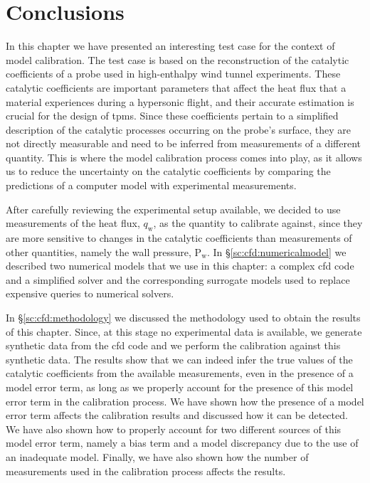 \section{Conclusions}
\label{sc:cfd:conclusions}

In this chapter we have presented an interesting test case for the context of model calibration. The test case is based on the reconstruction of the catalytic coefficients of a probe used in high-enthalpy wind tunnel experiments. These catalytic coefficients are important parameters that affect the heat flux that a material experiences during a hypersonic flight, and their accurate estimation is crucial for the design of \glspl{tpm}. Since these coefficients pertain to a simplified description of the catalytic processes occurring on the probe's surface, they are not directly measurable and need to be inferred from measurements of a different quantity. This is where the model calibration process comes into play, as it allows us to reduce the uncertainty on the catalytic coefficients by comparing the predictions of a computer model with experimental measurements. 

\smallskip
After carefully reviewing the experimental setup available, we decided to use measurements of the heat flux, $q_{\mathrm{w}}$, as the quantity to calibrate against, since they are more sensitive to changes in the catalytic coefficients than measurements of other quantities, namely the wall pressure, $\mathrm{P}_{\mathrm{w}}$. In \S\ref{sc:cfd:numericalmodel} we described two numerical models that we use in this chapter: a complex \gls{cfd} code and a simplified solver and the corresponding surrogate models used to replace expensive queries to numerical solvers. 

\smallskip
In \S\ref{sc:cfd:methodology} we discussed the methodology used to obtain the results of this chapter. Since, at this stage no experimental data is available, we generate synthetic data from the \gls{cfd} code and we perform the calibration against this synthetic data. The results show that we can indeed infer the true values of the catalytic coefficients from the available measurements, even in the presence of a model error term, as long as we properly account for the presence of this model error term in the calibration process. We have shown how the presence of a model error term affects the calibration results and discussed how it can be detected. We have also shown how to properly account for two different sources of this model error term, namely a bias term and a model discrepancy due to the use of an inadequate model. Finally, we have also shown how the number of measurements used in the calibration process affects the results.

